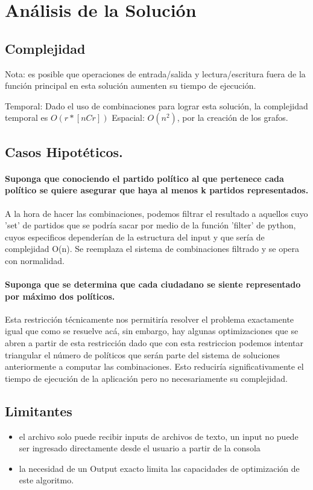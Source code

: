 \documentclass[a4paper]{article}
\begin{document}
\section{Análisis de la Solución}

\subsection{Complejidad}
Nota: es posible que operaciones de entrada/salida y lectura/escritura fuera de la función 
principal en esta solución aumenten su tiempo de ejecución.

Temporal: Dado el uso de combinaciones para lograr esta solución, la complejidad temporal es $ O( r * [nCr]) $
Espacial: $ O(n^2) $, por la creación de los grafos.
\subsection{Casos Hipotéticos.}
\paragraph{Suponga que conociendo el partido político al que pertenece cada político se
quiere asegurar que haya al menos k partidos representados.}

A la hora de hacer las combinaciones, podemos filtrar el resultado a aquellos cuyo 'set' de
partidos que se podría sacar por medio de la función 'filter' de python, cuyos especificos dependerían
de la estructura del input y que sería de complejidad O(n). Se reemplaza el sistema de combinaciones filtrado
y se opera con normalidad.

\paragraph{Suponga que se determina que cada ciudadano se siente representado por
máximo dos políticos.}

Esta restricción técnicamente nos permitiría resolver el problema exactamente igual que como se resuelve acá, sin
embargo, hay algunas optimizaciones que se abren a partir de esta restricción dado que con esta restriccion podemos
intentar triangular el número de políticos que serán parte del sistema de soluciones anteriormente a computar las
combinaciones. Esto reduciría significativamente el tiempo de ejecución de la aplicación pero no necesariamente
su complejidad.


\subsection{Limitantes}
    \begin{itemize}
        \item el archivo solo puede recibir inputs de archivos de texto, un input no
        puede ser ingresado directamente desde el usuario a partir de la consola
        \item la necesidad de un Output exacto limita las capacidades de optimización de 
        este algoritmo.
    \end{itemize}
\end{document}
